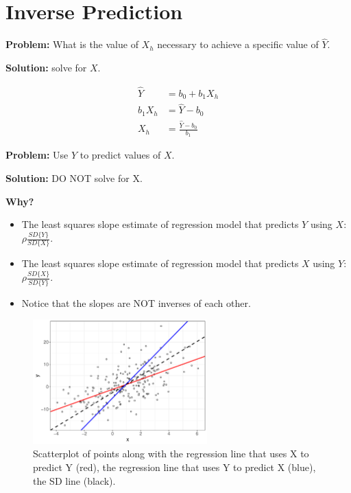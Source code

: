 \documentclass[12pt]{../notes}
\begin{document}
\section{Inverse Prediction}
\textbf{Problem:} What is the value of $X_h$ necessary to achieve a specific value of $\hat{Y}.$ 

\nspace
\textbf{Solution:} solve for $X$.

\begin{align*}
\hat{Y} &= b_0 + b_1X_h \\
b_1X_h &= \hat{Y} - b_0 \\
X_h &= \frac{\hat{Y} - b_0}{b_1}
\end{align*}

\nspace \textbf{Problem:} Use $Y$ to predict values of $X$. 

\nspace \textbf{Solution:} DO NOT solve for X. 

\nspace \textbf{Why?}

\begin{itemize}
\item The least squares slope estimate of regression model that predicts $Y$ using $X$: $\rho\frac{SD\{Y\}}{SD\{X\}}$.
\item The least squares slope estimate of regression model that predicts $X$ using $Y$: $\rho\frac{SD\{X\}}{SD\{Y\}}$.
\item Notice that the slopes are NOT inverses of each other. 
\end{itemize} 

\begin{figure}[H]
\centering
\includegraphics[width=0.6\textwidth]{../figures/module2/sdline.pdf}
\caption{Scatterplot of points along with the regression line that uses X to predict Y (red), the regression line that uses Y to predict X (blue), the SD line (black). }
\end{figure}
\end{document}

